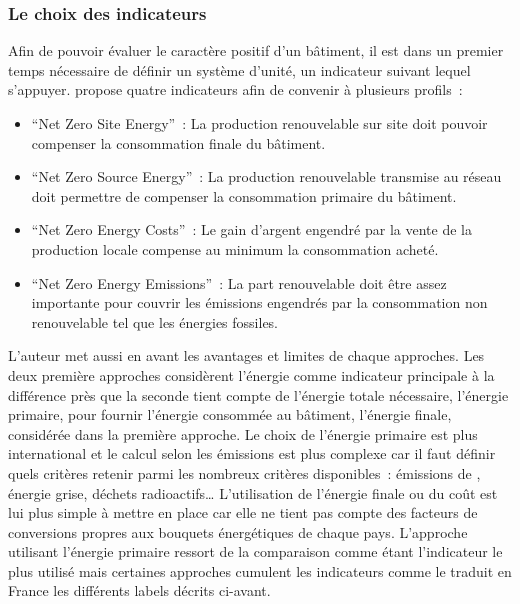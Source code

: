 \subsubsection{Le choix des indicateurs} %
\label{ssub:le_choix_des_indicateurs}
Afin de pouvoir évaluer le caractère positif d’un bâtiment, il est dans un premier
temps nécessaire de définir un système d’unité, un indicateur suivant lequel
s’appuyer. \textcite{Torcellini2006} propose quatre indicateurs afin de convenir
à plusieurs profils~:
\begin{itemize}
    \item \enquote{Net Zero Site Energy}~: La production renouvelable sur site
          doit pouvoir compenser la consommation finale du bâtiment.
    \item \enquote{Net Zero Source Energy}~: La production renouvelable transmise au réseau
          doit permettre de compenser la consommation primaire du bâtiment.
    \item \enquote{Net Zero Energy Costs}~: Le gain d’argent engendré par la vente
           de la production locale compense au minimum la consommation acheté.
    \item \enquote{Net Zero Energy Emissions}~: La part renouvelable doit être assez
           importante pour couvrir les émissions engendrés par la consommation non
           renouvelable tel que les énergies fossiles.
\end{itemize}
L’auteur met aussi en avant les avantages et limites de chaque approches. Les
deux première approches considèrent l’énergie comme indicateur principale à la différence
près que la seconde tient compte de l’énergie totale nécessaire, l’énergie primaire, pour fournir l’énergie consommée
au bâtiment, l’énergie finale, considérée dans la première approche. Le choix
de l’énergie primaire est plus international et le calcul selon les émissions
est plus complexe car il faut définir quels critères retenir parmi les nombreux critères
disponibles~: émissions de , énergie grise, déchets radioactifs\dots
L’utilisation de l’énergie finale ou du coût est lui plus simple à mettre en place
car elle ne tient pas compte des facteurs de conversions propres aux bouquets énergétiques de chaque pays.
L’approche utilisant l’énergie primaire ressort de la comparaison comme étant l’indicateur le
plus utilisé mais certaines approches cumulent les indicateurs comme le traduit en France les différents
labels décrits ci-avant.


